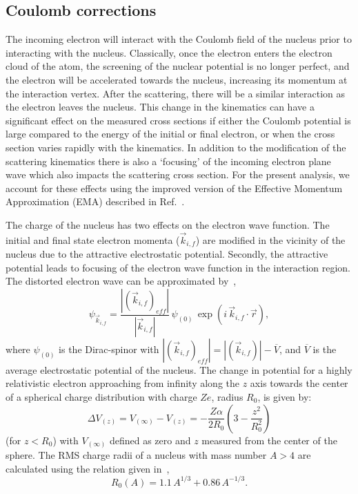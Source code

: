 \subsection{Coulomb corrections}\label{cc.ssec}

The incoming electron will interact with the Coulomb field of the nucleus
prior to interacting with the nucleus. Classically, once the electron enters
the electron cloud of the atom, the screening of the nuclear potential is
no longer perfect, and the electron will be accelerated towards the nucleus,
increasing its momentum at the interaction vertex. After the scattering,
there will be a similar interaction as the electron leaves the nucleus.
This change in the kinematics can have a significant effect on the measured
cross sections if either the Coulomb potential is large compared to the energy
of the initial or final electron, or when the cross section varies rapidly
with the kinematics. In addition to the modification of the scattering
kinematics there is also a `focusing' of the incoming electron plane wave which
also impacts the scattering cross section. For the present analysis, we account
for these effects using the improved version of the Effective Momentum
Approximation (EMA) described in Ref.~\cite{aste_ccor}.

The charge of the nucleus has two effects on the electron wave function. The
initial and final state electron momenta ($\vec{k}_{i,f}$) are modified in the
vicinity of the nucleus due to the attractive electrostatic potential.
Secondly, the attractive potential leads to focusing of the electron wave
function in the interaction region. The distorted electron wave can be
approximated by~\cite{rosenfelder_ccor, aste2_ccor},
%
\begin{equation}
\label{ccor1_eqn}
\psi_{\vec{k}_{i,f}}= \frac{|(\vec{k}_{i,f})_{eff}|}{|\vec{k}_{i,f}|} \,
\psi_{ (0)}\, \exp\left(i\,\vec{k}_{i,f}\cdot \vec{ r}\right),
\end{equation}
%
where $\psi_{(0)}$ is the Dirac-spinor with
$|(\vec{k}_{i,f})_{eff}|=|(\vec{k}_{i,f})| - \overline {V}$, and $\overline
{V}$ is the average electrostatic potential of the nucleus. The change in
potential for a highly relativistic electron approaching from infinity along
the $z$ axis towards the center of a spherical charge distribution with charge
$Ze$, radius $R_0$, is given by:
%
\begin{equation}
\label{ccor2_eqn}
\Delta V_{(z)} =V_{(\infty)} - V_{(z)} = -\frac{Z\alpha}{2 R_0}
\left(3-\frac{z^2}{R_0^2} \right)
\end{equation}
%
(for $z<R_0$) with $V_{(\infty)}$ defined as zero and $z$ measured from the
center of the sphere. The RMS charge radii of a nucleus with mass number $A>4$
are calculated using the relation given in~\cite{aste2_ccor},
%
\begin{equation}
\label{ccor5_eqn}
R_0(A) =1.1\,A^{1/3} +0.86\,A^{-1/3} .
\end{equation}

